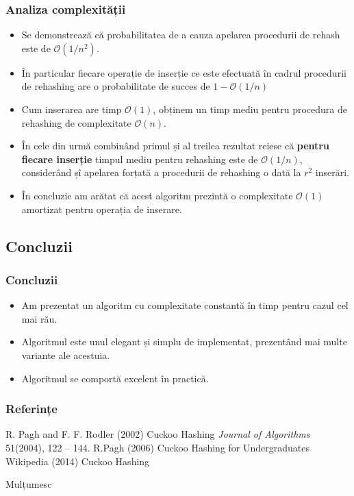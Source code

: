 \documentclass{beamer}
\begin{document}
\begin{frame}
\frametitle{Analiza complexității}
\begin{itemize}

\item Se demonstrează că probabilitatea de a cauza apelarea procedurii de rehash este de $\mathcal{O}(1/n^2).$

\item În particular fiecare operație de inserție ce este efectuată în cadrul procedurii de rehashing are o probabilitate de succes de $1 - \mathcal{O}(1/n)$

\item Cum inserarea are timp $\mathcal{O}(1)$, obținem un timp mediu pentru procedura de rehashing de complexitate $\mathcal{O}(n)$. 

\item În cele din urmă combinând primul și al treilea rezultat reiese că \textbf{pentru fiecare inserție} timpul mediu pentru rehashing este de $\mathcal{O}(1/n)$, considerând șî apelarea forțată a procedurii de rehashing o dată la $r^2$ inserări.

\item În concluzie am arătat că acest algoritm prezintă o complexitate $\mathcal{O}(1)$ amortizat pentru operația de inserare.
\end{itemize}
\end{frame}
\begin{frame}
\section{Concluzii}
\frametitle{Concluzii}
\begin{itemize}

\item Am prezentat un algoritm cu complexitate constantă în timp pentru cazul cel mai rău.

\item Algoritmul este unul elegant și simplu de implementat, prezentând mai multe variante ale acestuia.

\item Algoritmul se comportă excelent în practică.

\end{itemize}
\end{frame}

\begin{frame}
\frametitle{Referințe}
\footnotesize{
\begin{thebibliography}{99} %
  R. Pagh and F. F. Rodler (2002)
\newblock Cuckoo Hashing
\newblock \emph{Journal of Algorithms} 51(2004), 122 -- 144.
 R.Pagh (2006)
\newblock Cuckoo Hashing for Undergraduates
 Wikipedia (2014)
\newblock Cuckoo Hashing
\end{thebibliography}
}
\end{frame}


\begin{frame}
\Huge{\centerline{Mulțumesc}}
\end{frame}

\end{document}
